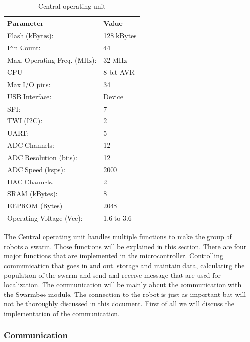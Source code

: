 \documentclass[10pt,a4paper]{article}
\begin{document}
\begin{table}[]
\centering
\caption{Central operating unit}
\label{cou}
\begin{tabular}{|l|l|}
\hline
\textbf{Parameter}			& \textbf{Value} \\ \hline
Flash (kBytes):             & 128 kBytes \\ \hline
Pin Count:                  & 44         \\ \hline
Max. Operating Freq. (MHz): & 32 MHz     \\ \hline
CPU:                        & 8-bit AVR  \\ \hline
Max I/O pins:               & 34         \\ \hline
USB Interface:              & Device     \\ \hline
SPI:                        & 7          \\ \hline
TWI (I2C):                  & 2          \\ \hline
UART:                       & 5          \\ \hline
ADC Channels:               & 12         \\ \hline
ADC Resolution (bits):      & 12         \\ \hline
ADC Speed (ksps):           & 2000       \\ \hline
DAC Channels:               & 2          \\ \hline
SRAM (kBytes):              & 8          \\ \hline
EEPROM (Bytes)              & 2048       \\ \hline
Operating Voltage (Vcc):    & 1.6 to 3.6 \\ \hline
\end{tabular}
\end{table}

The Central operating unit handles multiple functions to make the group of robots a swarm. Those functions will be explained in this section.
There are four major functions that are implemented in the microcontroller. Controlling communication that goes in and out, storage and maintain data, calculating the population of the swarm and send and receive message that are used for localization. The communication will be mainly about the communication with the Swarmbee module. The connection to the robot is just as important but will not be thoroughly discussed in this document. First of all we will discuss the implementation of the communication.

\subsubsection{Communication}
\end{document}
